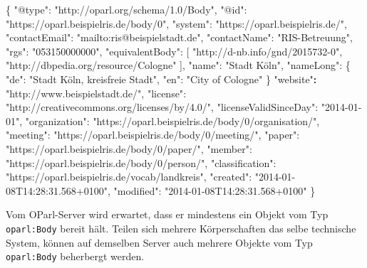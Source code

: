 \documentclass[,a4paper]{article}
\newenvironment{Shaded}{}{}
\newcommand{\DataTypeTok}[1]{\textcolor[rgb]{0.56,0.13,0.00}{{#1}}}
\newcommand{\StringTok}[1]{\textcolor[rgb]{0.25,0.44,0.63}{{#1}}}
\newcommand{\ErrorTok}[1]{\textcolor[rgb]{1.00,0.00,0.00}{\textbf{{#1}}}}
\newcommand{\NormalTok}[1]{{#1}}
\begin{document}
\begin{Shaded}
\begin{Highlighting}[]
\NormalTok{\{}
    \DataTypeTok{"@type"}\NormalTok{: }\StringTok{"http://oparl.org/schema/1.0/Body"}\NormalTok{,}
    \DataTypeTok{"@id"}\NormalTok{: }\StringTok{"https://oparl.beispielris.de/body/0"}\NormalTok{,}
    \DataTypeTok{"system"}\NormalTok{: }\StringTok{"https://oparl.beispielris.de/"}\NormalTok{,}
    \DataTypeTok{"contactEmail"}\NormalTok{: }\StringTok{"mailto:ris@beispielstadt.de"}\NormalTok{,}
    \DataTypeTok{"contactName"}\NormalTok{: }\StringTok{"RIS-Betreuung"}\NormalTok{,}
    \DataTypeTok{"rgs"}\NormalTok{: }\StringTok{"053150000000"}\NormalTok{,}
    \DataTypeTok{"equivalentBody"}\NormalTok{: [}
        \StringTok{"http://d-nb.info/gnd/2015732-0"}\NormalTok{,}
        \StringTok{"http://dbpedia.org/resource/Cologne"}
    \NormalTok{],}
    \DataTypeTok{"name"}\NormalTok{: }\StringTok{"Stadt Köln"}\NormalTok{,}
    \DataTypeTok{"nameLong"}\NormalTok{: \{}
        \DataTypeTok{"de"}\NormalTok{: }\StringTok{"Stadt Köln, kreisfreie Stadt"}\NormalTok{,}
        \DataTypeTok{"en"}\NormalTok{: }\StringTok{"City of Cologne"}
    \NormalTok{\}}
    \StringTok{"website"}\ErrorTok{:} \StringTok{"http://www.beispielstadt.de/"}\NormalTok{,}
    \DataTypeTok{"license"}\NormalTok{: }\StringTok{"http://creativecommons.org/licenses/by/4.0/"}\NormalTok{,}
    \DataTypeTok{"licenseValidSinceDay"}\NormalTok{: }\StringTok{"2014-01-01"}\NormalTok{,}
    \DataTypeTok{"organization"}\NormalTok{: }\StringTok{"https://oparl.beispielris.de/body/0/organisation/"}\NormalTok{,}
    \DataTypeTok{"meeting"}\NormalTok{: }\StringTok{"https://oparl.beispielris.de/body/0/meeting/"}\NormalTok{,}
    \DataTypeTok{"paper"}\NormalTok{: }\StringTok{"https://oparl.beispielris.de/body/0/paper/"}\NormalTok{,}
    \DataTypeTok{"member"}\NormalTok{: }\StringTok{"https://oparl.beispielris.de/body/0/person/"}\NormalTok{,}
    \DataTypeTok{"classification"}\NormalTok{: }\StringTok{"https://oparl.beispielris.de/vocab/landkreis"}\NormalTok{,}
    \DataTypeTok{"created"}\NormalTok{: }\StringTok{"2014-01-08T14:28:31.568+0100"}\NormalTok{,}
    \DataTypeTok{"modified"}\NormalTok{: }\StringTok{"2014-01-08T14:28:31.568+0100"}
\NormalTok{\}}
\end{Highlighting}
\end{Shaded}

Vom OParl-Server wird erwartet, dass er mindestens ein Objekt vom Typ
\texttt{oparl:Body} bereit hält. Teilen sich mehrere Körperschaften das
selbe technische System, können auf demselben Server auch mehrere
Objekte vom Typ \texttt{oparl:Body} beherbergt werden.
\end{document}
